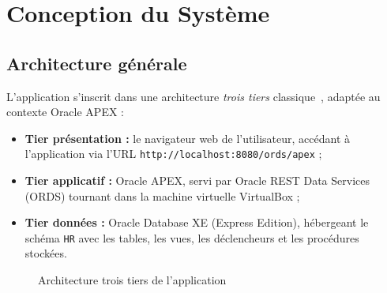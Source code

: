 \documentclass[12pt,a4paper,oneside]{report}
\begin{document}
\chapter{Conception du Système}

\section{Architecture générale}

L'application s'inscrit dans une architecture \textit{trois tiers} classique~\cite{oracle_db_design}, adaptée au contexte Oracle APEX :

\begin{itemize}[leftmargin=2em]
  \item \textbf{Tier présentation :} le navigateur web de l'utilisateur, accédant à l'application via l'URL \texttt{http://localhost:8080/ords/apex} ;
  \item \textbf{Tier applicatif :} Oracle APEX, servi par Oracle REST Data Services (ORDS) tournant dans la machine virtuelle VirtualBox ;
  \item \textbf{Tier données :} Oracle Database XE (Express Edition), hébergeant le schéma \texttt{HR} avec les tables, les vues, les déclencheurs et les procédures stockées.
\end{itemize}

\begin{figure}[H]
  \centering
  \caption{Architecture trois tiers de l'application}
  \label{fig:architecture}
\end{figure}
\end{document}
